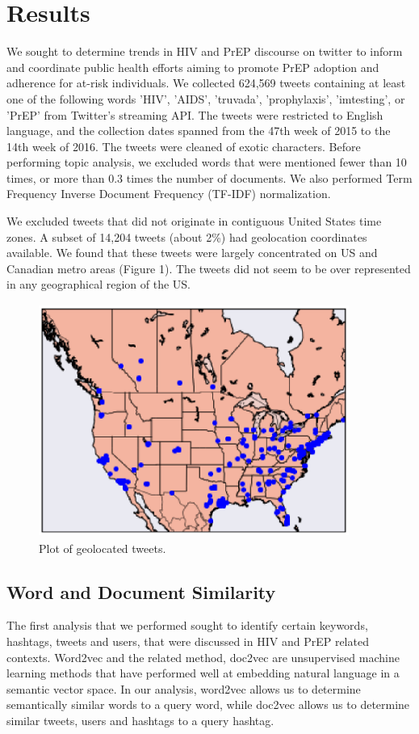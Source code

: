 \documentclass{sig-alternate-05-2015}
\begin{document}
\section{Results}
We sought to determine trends in HIV and PrEP discourse on twitter to inform and coordinate public health efforts aiming to promote PrEP adoption and adherence for at-risk individuals. We collected 624,569 tweets containing at least one of the following words 'HIV', 'AIDS', 'truvada', 'prophylaxis', 'imtesting', or 'PrEP' from Twitter's streaming API. The tweets were restricted to English language, and the collection dates spanned from the 47th week of 2015 to the 14th week of 2016. The tweets were cleaned of exotic characters. Before performing topic analysis, we excluded words that were mentioned fewer than 10 times, or more than 0.3 times the number of documents. We also performed Term Frequency Inverse Document Frequency (TF-IDF) normalization.

We excluded tweets that did not originate in contiguous United States time zones. A subset of 14,204 tweets (about 2\%) had geolocation coordinates available. We found that these tweets were largely concentrated on US and Canadian metro areas (Figure 1). The tweets did not seem to be over represented in any geographical region of the US.

\begin{figure}
\centering
\includegraphics[height=3in, width=4in]{map}
\caption{Plot of geolocated tweets.}
\end{figure}

\subsection{Word and Document Similarity}

The first analysis that we performed sought to identify certain keywords, hashtags, tweets and users, that were discussed in HIV and PrEP related contexts. Word2vec and the related method, doc2vec are unsupervised machine learning methods that have performed well at embedding natural language in a semantic vector space. In our analysis, word2vec allows us to determine semantically similar words to a query word, while doc2vec allows us to determine similar tweets, users and hashtags to a query hashtag.
\end{document}
